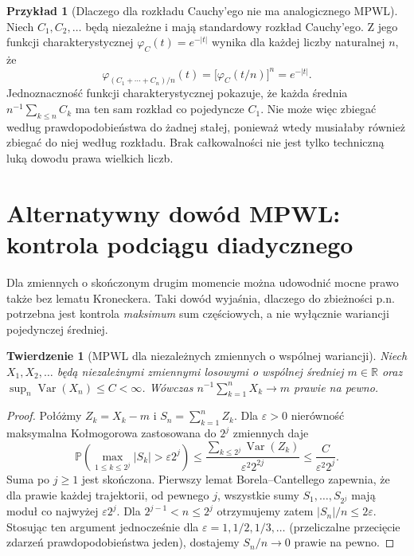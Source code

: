 \documentclass[11pt,a4paper,oneside]{report}
\numberwithin{equation}{chapter}
\theoremstyle{plain}
\newtheorem{twierdzenie}{Twierdzenie}[chapter]
\theoremstyle{definition}
\newtheorem{przyklad}{Przykład}[chapter]
\theoremstyle{remark}
\newcommand{\R}{\mathbb{R}}
\newcommand{\Prob}{\mathbb{P}}
\newcommand{\Var}{\operatorname{Var}}
\begin{document}
\begin{przyklad}[Dlaczego dla rozkładu Cauchy'ego nie ma analogicznego MPWL]
Niech $C_1,C_2,\ldots$ będą niezależne i mają
standardowy rozkład Cauchy'ego. Z jego funkcji
charakterystycznej $\varphi_C(t)=e^{-|t|}$
wynika dla każdej liczby naturalnej $n$, że
\[
\varphi_{(C_1+\cdots+C_n)/n}(t)
=\bigl[\varphi_C(t/n)\bigr]^n=e^{-|t|}.
\]
Jednoznaczność funkcji charakterystycznej pokazuje,
że każda średnia $n^{-1}\sum_{k\leq n}C_k$ ma ten sam
rozkład co pojedyncze $C_1$. Nie może więc zbiegać
według prawdopodobieństwa do żadnej stałej, ponieważ
wtedy musiałaby również zbiegać do niej według rozkładu.
Brak całkowalności nie jest tylko techniczną luką
dowodu prawa wielkich liczb.
\end{przyklad}

\section{Alternatywny dowód MPWL: kontrola podciągu diadycznego}

Dla zmiennych o skończonym drugim momencie można udowodnić
mocne prawo także bez lematu Kroneckera. Taki dowód
wyjaśnia, dlaczego do zbieżności p.n. potrzebna jest
kontrola \emph{maksimum} sum częściowych, a nie wyłącznie
wariancji pojedynczej średniej.

\begin{twierdzenie}[MPWL dla niezależnych zmiennych o wspólnej wariancji]
Niech $X_1,X_2,\ldots$ będą niezależnymi zmiennymi
losowymi o wspólnej średniej $m\in\R$ oraz
$\sup_n\Var(X_n)\leq C<\infty$.
Wówczas $n^{-1}\sum_{k=1}^nX_k\to m$ prawie na pewno.
\end{twierdzenie}
\begin{proof}
Połóżmy $Z_k=X_k-m$ i $S_n=\sum_{k=1}^nZ_k$.
Dla $\varepsilon>0$ nierówność maksymalna
Kołmogorowa zastosowana do $2^j$ zmiennych daje
\[
\Prob\left(\max_{1\leq k\leq2^j}|S_k|>
\varepsilon2^j\right)
\leq\frac{\sum_{k\leq2^j}\Var(Z_k)}
{\varepsilon^2 2^{2j}}
\leq\frac{C}{\varepsilon^2 2^j}.
\]
Suma po $j\geq1$ jest skończona. Pierwszy lemat
Borela--Cantellego zapewnia, że dla prawie każdej
trajektorii, od pewnego $j$, wszystkie sumy
$S_1,\ldots,S_{2^j}$ mają moduł co najwyżej
$\varepsilon2^j$.
Dla $2^{j-1}<n\leq2^j$ otrzymujemy zatem
$|S_n|/n\leq2\varepsilon$.
Stosując ten argument jednocześnie dla
$\varepsilon=1,1/2,1/3,\ldots$ (przeliczalne
przecięcie zdarzeń prawdopodobieństwa jeden),
dostajemy $S_n/n\to0$ prawie na pewno.
\end{proof}
\end{document}
